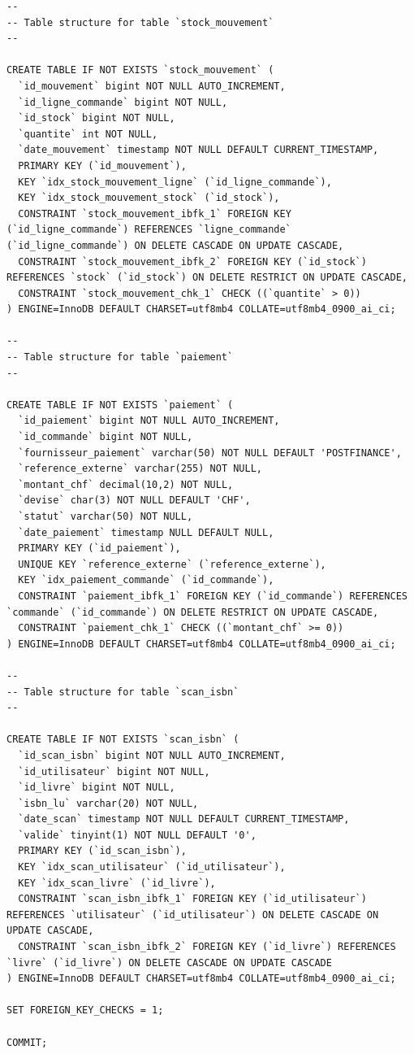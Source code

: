 \documentclass[12pt, a4paper]{report}
\renewcommand{\_}{\origunderscore\allowbreak}
\begin{document}
\begin{lstlisting}[style=sqlstyle, caption={Script DDL — Création de la base de données CARIBOOKS (extrait verbatim de \texttt{Schema.SQL})}, label={lst:ddl}]
--
-- Table structure for table `stock_mouvement`
--

CREATE TABLE IF NOT EXISTS `stock_mouvement` (
  `id_mouvement` bigint NOT NULL AUTO_INCREMENT,
  `id_ligne_commande` bigint NOT NULL,
  `id_stock` bigint NOT NULL,
  `quantite` int NOT NULL,
  `date_mouvement` timestamp NOT NULL DEFAULT CURRENT_TIMESTAMP,
  PRIMARY KEY (`id_mouvement`),
  KEY `idx_stock_mouvement_ligne` (`id_ligne_commande`),
  KEY `idx_stock_mouvement_stock` (`id_stock`),
  CONSTRAINT `stock_mouvement_ibfk_1` FOREIGN KEY (`id_ligne_commande`) REFERENCES `ligne_commande` (`id_ligne_commande`) ON DELETE CASCADE ON UPDATE CASCADE,
  CONSTRAINT `stock_mouvement_ibfk_2` FOREIGN KEY (`id_stock`) REFERENCES `stock` (`id_stock`) ON DELETE RESTRICT ON UPDATE CASCADE,
  CONSTRAINT `stock_mouvement_chk_1` CHECK ((`quantite` > 0))
) ENGINE=InnoDB DEFAULT CHARSET=utf8mb4 COLLATE=utf8mb4_0900_ai_ci;

--
-- Table structure for table `paiement`
--

CREATE TABLE IF NOT EXISTS `paiement` (
  `id_paiement` bigint NOT NULL AUTO_INCREMENT,
  `id_commande` bigint NOT NULL,
  `fournisseur_paiement` varchar(50) NOT NULL DEFAULT 'POSTFINANCE',
  `reference_externe` varchar(255) NOT NULL,
  `montant_chf` decimal(10,2) NOT NULL,
  `devise` char(3) NOT NULL DEFAULT 'CHF',
  `statut` varchar(50) NOT NULL,
  `date_paiement` timestamp NULL DEFAULT NULL,
  PRIMARY KEY (`id_paiement`),
  UNIQUE KEY `reference_externe` (`reference_externe`),
  KEY `idx_paiement_commande` (`id_commande`),
  CONSTRAINT `paiement_ibfk_1` FOREIGN KEY (`id_commande`) REFERENCES `commande` (`id_commande`) ON DELETE RESTRICT ON UPDATE CASCADE,
  CONSTRAINT `paiement_chk_1` CHECK ((`montant_chf` >= 0))
) ENGINE=InnoDB DEFAULT CHARSET=utf8mb4 COLLATE=utf8mb4_0900_ai_ci;

--
-- Table structure for table `scan_isbn`
--

CREATE TABLE IF NOT EXISTS `scan_isbn` (
  `id_scan_isbn` bigint NOT NULL AUTO_INCREMENT,
  `id_utilisateur` bigint NOT NULL,
  `id_livre` bigint NOT NULL,
  `isbn_lu` varchar(20) NOT NULL,
  `date_scan` timestamp NOT NULL DEFAULT CURRENT_TIMESTAMP,
  `valide` tinyint(1) NOT NULL DEFAULT '0',
  PRIMARY KEY (`id_scan_isbn`),
  KEY `idx_scan_utilisateur` (`id_utilisateur`),
  KEY `idx_scan_livre` (`id_livre`),
  CONSTRAINT `scan_isbn_ibfk_1` FOREIGN KEY (`id_utilisateur`) REFERENCES `utilisateur` (`id_utilisateur`) ON DELETE CASCADE ON UPDATE CASCADE,
  CONSTRAINT `scan_isbn_ibfk_2` FOREIGN KEY (`id_livre`) REFERENCES `livre` (`id_livre`) ON DELETE CASCADE ON UPDATE CASCADE
) ENGINE=InnoDB DEFAULT CHARSET=utf8mb4 COLLATE=utf8mb4_0900_ai_ci;

SET FOREIGN_KEY_CHECKS = 1;

COMMIT;
\end{lstlisting}
\end{document}
